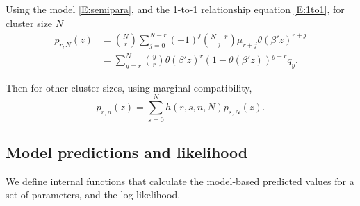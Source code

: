 \documentclass[reqno]{amsart}
\begin{document}
Using the model \eqref{E:semipara}, and the 1-to-1 relationship equation \eqref{E:1to1}, for cluster size $N$
\begin{equation}\label{E:Qresp}
\begin{split}
p_{r,N}(z) &= \binom{N}{r} {\sum_{j=0}^{N-r}} {(-1)^j} \binom{N-r}{j} {\mu_{r+j}} {\theta(\beta'z)^{r+j}} \\
      &= \sum_{y=r}^N \binom{y}{r} {\theta(\beta'z)^r} {(1-\theta(\beta'z))}^{y-r} {q_y}.
\end{split}
\end{equation}

Then for other cluster sizes, using marginal compatibility,
\begin{equation*}
p_{r,n}(z) = \sum_{s=0}^{N} h(r,s,n,N)p_{s,N}(z).
\end{equation*}

\subsection{Model predictions and likelihood}
We define internal functions that calculate the model-based predicted values for a set of parameters, and the log-likelihood.
\end{document}
